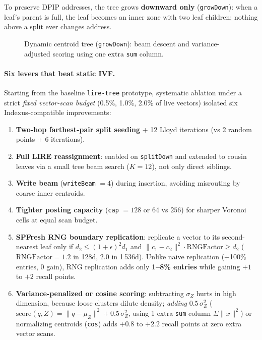 \documentclass[11pt]{article}
\begin{document}
To preserve DPIP addresses, the tree grows \textbf{downward only} (\texttt{growDown}): when a leaf's parent is full, the leaf becomes an inner zone with two leaf children; nothing above a split ever changes address.

\begin{figure}[H]
    \centering
    \caption{Dynamic centroid tree (\texttt{growDown}): beam descent and variance-adjusted scoring using one extra \texttt{sum} column.}
\end{figure}

\paragraph{Six levers that beat static IVF.}
Starting from the baseline \texttt{lire-tree} prototype, systematic ablation under a strict \emph{fixed vector-scan budget} (0.5\%, 1.0\%, 2.0\% of live vectors) isolated six Indexus-compatible improvements:
\begin{enumerate}[leftmargin=1.5em,itemsep=1pt]
  \item \textbf{Two-hop farthest-pair split seeding} + 12 Lloyd iterations (vs 2 random points + 6 iterations).
  \item \textbf{Full LIRE reassignment}: enabled on \texttt{splitDown} and extended to cousin leaves via a small tree beam search ($K=12$), not only direct siblings.
  \item \textbf{Write beam} (\texttt{writeBeam} $= 4$) during insertion, avoiding misrouting by coarse inner centroids.
  \item \textbf{Tighter posting capacity} (\texttt{cap} $= 128$ or $64$ vs $256$) for sharper Voronoi cells at equal scan budget.
  \item \textbf{SPFresh RNG boundary replication}: replicate a vector to its second-nearest leaf only if $d_2 \le (1+\epsilon)^2 d_1$ and $\|c_1 - c_2\|^2 \cdot \mathrm{RNGFactor} \ge d_2$ ($\mathrm{RNGFactor} = 1.2$ in 128d, $2.0$ in 1\,536d). Unlike naive replication (+100\% entries, 0 gain), RNG replication adds only \textbf{1--8\% entries} while gaining $+1$ to $+2$ recall points.
  \item \textbf{Variance-penalized or cosine scoring}: subtracting $\sigma_Z$ hurts in high dimension, because loose clusters dilute density; \emph{adding} $0.5\,\sigma_Z^2$ ($\mathrm{score}(q, Z) = \|q - \mu_Z\|^2 + 0.5\,\sigma_Z^2$, using 1 extra \texttt{sum} column $\Sigma\|x\|^2$) or normalizing centroids (\texttt{cos}) adds $+0.8$ to $+2.2$ recall points at zero extra vector scans.
\end{enumerate}
\end{document}
